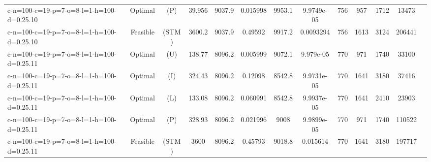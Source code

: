 \documentclass[landscape, a4paper]{article}
\newcommand{\STM}{\ensuremath{\mathrm{STM}}}
\newcommand{\Improved}{\ensuremath{\mathrm{I}}}
\newcommand{\Loose}{\ensuremath{\mathrm{L}}}
\newcommand{\Profit}{\ensuremath{\mathrm{P}}}
\newcommand{\Utility}{\ensuremath{\mathrm{U}}}
\begin{document}
\begin{center}
\begin{tabular}{lcccccccccccc}
c-n=100-c=19-p=7-o=8-l=1-h=100-d=0.25.10 & Optimal & (\Profit) & 39.956 & 9037.9 & 0.015998 & 9953.1 & 9.9749e-05 & 756 & 957 & 1712 & 13473 & \\
c-n=100-c=19-p=7-o=8-l=1-h=100-d=0.25.10 & Feasible & (\STM) & 3600.2 & 9037.9 & 0.49592 & 9917.2 & 0.0093294 & 756 & 1613 & 3124 & 206441 & \\
c-n=100-c=19-p=7-o=8-l=1-h=100-d=0.25.11 & Optimal & (\Utility) & 138.77 & 8096.2 & 0.005999 & 9072.1 & 9.979e-05 & 770 & 971 & 1740 & 33100 & \\
c-n=100-c=19-p=7-o=8-l=1-h=100-d=0.25.11 & Optimal & (\Improved) & 324.43 & 8096.2 & 0.12098 & 8542.8 & 9.9731e-05 & 770 & 1641 & 3180 & 37416 & \\
c-n=100-c=19-p=7-o=8-l=1-h=100-d=0.25.11 & Optimal & (\Loose) & 133.08 & 8096.2 & 0.060991 & 8542.8 & 9.9937e-05 & 770 & 1641 & 2410 & 23903 & \\
c-n=100-c=19-p=7-o=8-l=1-h=100-d=0.25.11 & Optimal & (\Profit) & 328.93 & 8096.2 & 0.021996 & 9008 & 9.9899e-05 & 770 & 971 & 1740 & 110522 & \\
c-n=100-c=19-p=7-o=8-l=1-h=100-d=0.25.11 & Feasible & (\STM) & 3600 & 8096.2 & 0.45793 & 9018.8 & 0.015614 & 770 & 1641 & 3180 & 197717 & \\
\end{tabular}
\end{center}
\end{document}
